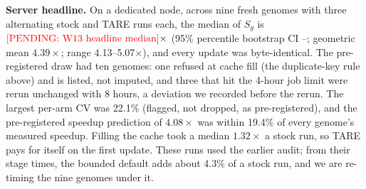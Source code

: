 \documentclass[letterpaper,twocolumn,10pt]{article}
\theoremstyle{definition}
\newcommand{\sys}{TARE\xspace}
\newcommand{\sys}{PARE\xspace}
\begin{document}
\textbf{Server headline.} On a dedicated node, across nine fresh genomes with three alternating stock and \sys runs
each, the median of $S_g$ is $\textcolor{red}{\mbox{[PENDING: W13 headline median]}}\times$ (95\% percentile bootstrap CI \HeadlineBoundedCIlow--\HeadlineBoundedCIhigh; geometric mean $4.39\times$; range
4.13--5.07$\times$), and every update was byte\nobreakdash-identical. The pre\nobreakdash-registered draw had ten genomes: one refused at
cache fill (the duplicate\nobreakdash-key rule above) and is listed, not imputed, and three that hit the 4-hour job limit were rerun
unchanged with 8 hours, a deviation we recorded before the rerun. The largest per\nobreakdash-arm CV was 22.1\% (flagged, not dropped,
as pre\nobreakdash-registered), and the pre\nobreakdash-registered speedup prediction of $4.08\times$ was within 19.4\% of every genome's measured speedup. Filling the cache
took a median $1.32\times$ a stock run, so \sys pays for itself on the first update. These runs used the earlier audit;
from their stage times, the bounded default adds about 4.3\% of a stock run, and we are re\nobreakdash-timing the nine
genomes under it.
\end{document}
